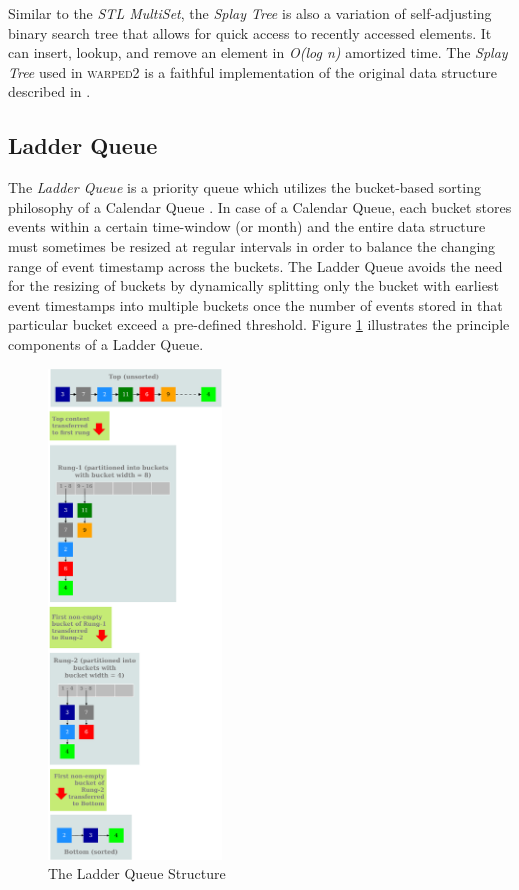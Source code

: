 \documentclass[11pt]{book}
\begin{document}
Similar to the \emph{STL MultiSet}, the \emph{Splay Tree} \cite{sleator-85} is also a variation of
self-adjusting binary search tree that allows for quick access to recently accessed elements.  It can insert,
lookup, and remove an element in \emph{O(log n)} amortized time.  The \emph{Splay Tree} used in
\textsc{warped2} is a faithful implementation of the original data structure described in \cite{sleator-85}.

\subsection{Ladder Queue}\label{subsec:ladderq}

The \emph{Ladder Queue} \cite{tang-05} is a priority queue which utilizes the bucket-based sorting philosophy
of a Calendar Queue \cite{brown-88}.  In case of a Calendar Queue, each bucket stores events within a certain
time-window (or month) and the entire data structure must sometimes be resized at regular intervals in order
to balance the changing range of event timestamp across the buckets.  The Ladder Queue avoids the need for the
resizing of buckets by dynamically splitting only the bucket with earliest event timestamps into multiple
buckets once the number of events stored in that particular bucket exceed a pre-defined threshold.  Figure
\ref{fig:ladderq_sorted} illustrates the principle components of a Ladder Queue.

\begin{figure}
    \centerline{\includegraphics[width=0.41\textwidth]{figures/ladderq_sorted.pdf}}
    \caption{The Ladder Queue Structure}
    \label{fig:ladderq_sorted}
\end{figure}
\end{document}
